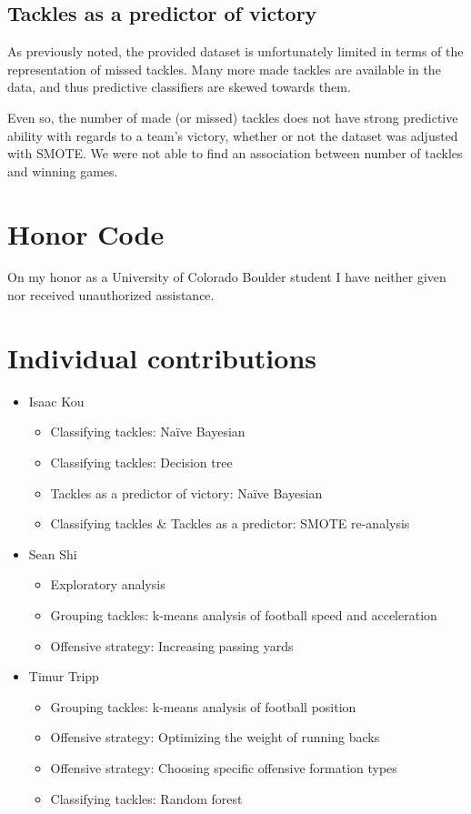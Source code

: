 \documentclass[bibtex, sigconf, hyperref={colorlinks=true,linkcolor=blue,urlcolor=blue}]{acmart}
\begin{document}
\subsection{Tackles as a predictor of victory}

As previously noted, the provided dataset is unfortunately limited in terms of the representation of
missed tackles. Many more made tackles are available in the data, and thus predictive classifiers are
skewed towards them.

Even so, the number of made (or missed) tackles does not have strong predictive ability with regards to
a team's victory, whether or not the dataset was adjusted with SMOTE. We were not able to find an
association between number of tackles and winning games.



\nocite{*}

\appendix

\section{Honor Code}

On my honor as a University of Colorado Boulder student I have neither given nor
received unauthorized assistance.

\section{Individual contributions}

\begin{itemize}
  \item Isaac Kou
  \begin{itemize}
    \item Classifying tackles: Na\"ive Bayesian
    \item Classifying tackles: Decision tree
    \item Tackles as a predictor of victory: Na\"ive Bayesian
    \item Classifying tackles \& Tackles as a predictor: SMOTE re-analysis
  \end{itemize}
  \item Sean Shi
  \begin{itemize}
    \item Exploratory analysis
    \item Grouping tackles: k-means analysis of football speed and acceleration
    \item Offensive strategy: Increasing passing yards
  \end{itemize}
  \item Timur Tripp
  \begin{itemize}
    \item Grouping tackles: k-means analysis of football position
    \item Offensive strategy: Optimizing the weight of running backs
    \item Offensive strategy: Choosing specific offensive formation types
    \item Classifying tackles: Random forest
  \end{itemize}
\end{itemize}
\end{document}
